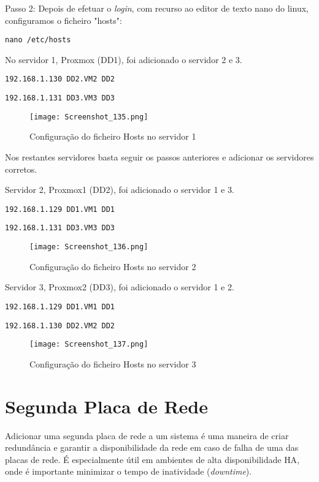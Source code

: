 \newpage
Passo 2: Depois de efetuar o \textit{login}, com recurso ao editor de texto nano do linux, configuramos o ficheiro "hosts":
\begin{verbatim}nano /etc/hosts\end{verbatim}

No servidor 1, Proxmox (DD1), foi adicionado o servidor 2 e 3.
\begin{verbatim}192.168.1.130 DD2.VM2 DD2\end{verbatim}
\begin{verbatim}192.168.1.131 DD3.VM3 DD3\end{verbatim}

\begin{figure}[H]
\center
\texttt{[image: Screenshot\_135.png]}
\caption{Configuração do ficheiro Hosts no servidor 1}
\end{figure}

Nos restantes servidores basta seguir os passos anteriores e adicionar os servidores corretos.

\newpage
Servidor 2, Proxmox1 (DD2), foi adicionado o servidor 1 e 3.
\begin{verbatim}192.168.1.129 DD1.VM1 DD1\end{verbatim}
\begin{verbatim}192.168.1.131 DD3.VM3 DD3\end{verbatim}

\begin{figure}[H]
\center
\texttt{[image: Screenshot\_136.png]}
\caption{Configuração do ficheiro Hosts no servidor 2}
\end{figure}

Servidor 3, Proxmox2 (DD3), foi adicionado o servidor 1 e 2.
\begin{verbatim}192.168.1.129 DD1.VM1 DD1\end{verbatim}
\begin{verbatim}192.168.1.130 DD2.VM2 DD2\end{verbatim}

\begin{figure}[H]
\center
\texttt{[image: Screenshot\_137.png]}
\caption{Configuração do ficheiro Hosts no servidor 3}
\end{figure}


\section{Segunda Placa de Rede}
Adicionar uma segunda placa de rede a um sistema é uma maneira de criar redundância e garantir a disponibilidade da rede em caso de falha de uma das placas de rede. É especialmente útil em ambientes de alta disponibilidade \ac{HA}, onde é importante minimizar o tempo de inatividade (\textit{downtime}).

